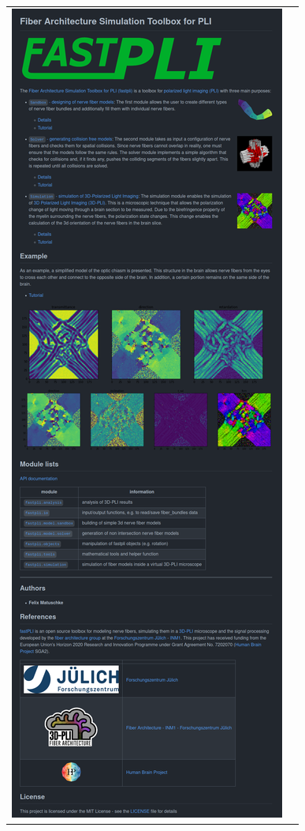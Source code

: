 \begin{figure}[!t]
{{\begin{tabular}{c|c}
 	\includegraphics[valign=T,trim=0 0 0 1580, clip]{gfx/fastpli/fastpli_wiki.png} \\
    \end{tabular}
    }}
	\caption{\dummy{}}
	\label{fig:fastpli_wiki}
\end{figure}
